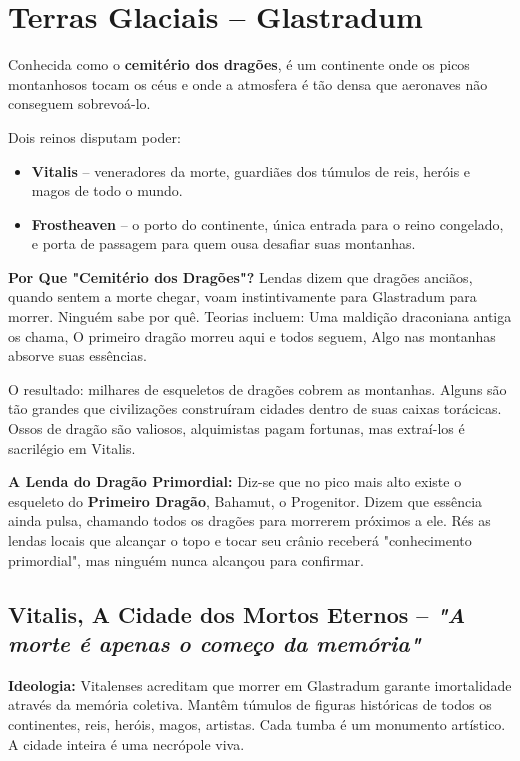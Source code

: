 \section*{Terras Glaciais – Glastradum}
Conhecida como o \textbf{cemitério dos dragões}, é um continente onde os picos montanhosos tocam os céus e onde a atmosfera é tão densa que aeronaves não conseguem sobrevoá-lo.

Dois reinos disputam poder:
\begin{itemize}
    \item \textbf{Vitalis} – veneradores da morte, guardiães dos túmulos de reis, heróis e magos de todo o mundo.
    \item \textbf{Frostheaven} – o porto do continente, única entrada para o reino congelado, e porta de passagem para quem ousa desafiar suas montanhas.
\end{itemize}

\textbf{\ringmfamily Por Que "Cemitério dos Dragões"?}
Lendas dizem que dragões anciãos, quando sentem a morte chegar, voam instintivamente para Glastradum para morrer. Ninguém sabe por quê. Teorias incluem: Uma maldição draconiana antiga os chama, O primeiro dragão morreu aqui e todos seguem, Algo nas montanhas absorve suas essências.

O resultado: milhares de esqueletos de dragões cobrem as montanhas. Alguns são tão grandes que civilizações construíram cidades dentro de suas caixas torácicas. Ossos de dragão são valiosos, alquimistas pagam fortunas, mas extraí-los é sacrilégio em Vitalis.

\textbf{\ringmfamily A Lenda do Dragão Primordial:}
Diz-se que no pico mais alto existe o esqueleto do \textbf{Primeiro Dragão}, Bahamut, o Progenitor. Dizem que essência ainda pulsa, chamando todos os dragões para morrerem próximos a ele. Rés as lendas locais que alcançar o topo e tocar seu crânio receberá "conhecimento primordial", mas ninguém nunca alcançou para confirmar.

\subsection*{Vitalis, A Cidade dos Mortos Eternos – \textit{"A morte é apenas o começo da memória"}}

\textbf{\ringmfamily Ideologia:} Vitalenses acreditam que morrer em Glastradum garante imortalidade através da memória coletiva. Mantêm túmulos de figuras históricas de todos os continentes, reis, heróis, magos, artistas. Cada tumba é um monumento artístico. A cidade inteira é uma necrópole viva.

